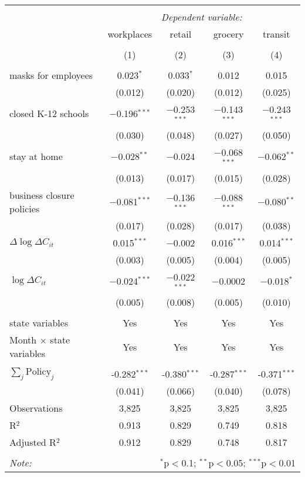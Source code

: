 \begin{tabular}{@{\extracolsep{1pt}}lcccc} 
\\[-1.8ex]\hline 
\hline \\[-1.8ex] 
 & \multicolumn{4}{c}{\textit{Dependent variable:}} \\ 
\cline{2-5} 
 & workplaces & retail & grocery & transit \\ 
\\[-1.8ex] & (1) & (2) & (3) & (4)\\ 
\hline \\[-1.8ex] 
 masks for employees & 0.023$^{*}$ & 0.033$^{*}$ & 0.012 & 0.015 \\ 
  & (0.012) & (0.020) & (0.012) & (0.025) \\ 
  closed K-12 schools & $-$0.196$^{***}$ & $-$0.253$^{***}$ & $-$0.143$^{***}$ & $-$0.243$^{***}$ \\ 
  & (0.030) & (0.048) & (0.027) & (0.050) \\ 
  stay at home & $-$0.028$^{**}$ & $-$0.024 & $-$0.068$^{***}$ & $-$0.062$^{**}$ \\ 
  & (0.013) & (0.017) & (0.015) & (0.028) \\ 
  business closure policies & $-$0.081$^{***}$ & $-$0.136$^{***}$ & $-$0.088$^{***}$ & $-$0.080$^{**}$ \\ 
  & (0.017) & (0.028) & (0.017) & (0.038) \\ 
  $\Delta \log \Delta C_{it}$ & 0.015$^{***}$ & $-$0.002 & 0.016$^{***}$ & 0.014$^{***}$ \\ 
  & (0.003) & (0.005) & (0.004) & (0.005) \\ 
  $\log \Delta C_{it}$ & $-$0.024$^{***}$ & $-$0.022$^{***}$ & $-$0.0002 & $-$0.018$^{*}$ \\ 
  & (0.005) & (0.008) & (0.005) & (0.010) \\ 
 \hline \\[-1.8ex] 
state variables & Yes & Yes & Yes & Yes \\ 
Month $\times$ state variables & Yes & Yes & Yes & Yes \\ 
\hline \\[-1.8ex] 
$\sum_j \mathrm{Policy}_j$ & -0.282$^{***}$ & -0.380$^{***}$ & -0.287$^{***}$ & -0.371$^{***}$ \\ 
 & (0.041) & (0.066) & (0.040) & (0.078) \\ 
Observations & 3,825 & 3,825 & 3,825 & 3,825 \\ 
R$^{2}$ & 0.913 & 0.829 & 0.749 & 0.818 \\ 
Adjusted R$^{2}$ & 0.912 & 0.829 & 0.748 & 0.817 \\ 
\hline 
\hline \\[-1.8ex] 
\textit{Note:}  & \multicolumn{4}{r}{$^{*}$p$<$0.1; $^{**}$p$<$0.05; $^{***}$p$<$0.01} \\ 
\end{tabular} 